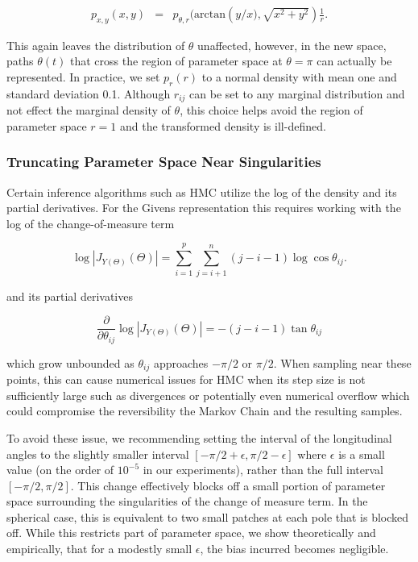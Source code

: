 \documentclass[ba]{imsart}
\numberwithin{equation}{section}
\theoremstyle{plain}
\begin{document}
\begin{eqnarray}
p_{x, y}(x,y) &=& p_{\theta, r}(\mathrm{arctan} \left(y/x), \sqrt{x^2 + y^2} \right) \frac{1}{r}.
\end{eqnarray}

\noindent This again leaves the distribution of $\theta$ unaffected, however, in the new space, paths $\theta(t)$ that cross the region of parameter space at $\theta = \pi$ can actually be represented. In practice, we set  $p_r(r)$ to a normal density with mean one and standard deviation 0.1. Although $r_{ij}$ can be set to any marginal distribution and not effect the marginal density of $\theta$, this choice helps avoid the region of parameter space $r = 1$ and the transformed density is ill-defined.

\subsubsection{Truncating Parameter Space Near Singularities}
\noindent  Certain inference algorithms such as HMC utilize the log of the density and its partial derivatives. For the Givens representation this requires working with the log of the change-of-measure term 

\begin{equation}
\log |J_{Y(\Theta)}(\Theta)| = \sum_{i=1}^p \sum_{j=i+1}^n (j-i-1) \log \cos \theta_{ij}.
\end{equation}

\noindent and its partial derivatives

\begin{equation}
\frac{\partial}{\partial \theta_{ij}}\log |J_{Y(\Theta)}(\Theta)| = -(j-i-1) \tan \theta_{ij}
\end{equation}

\noindent which grow unbounded as $\theta_{ij}$ approaches $-\pi/2$ or $\pi/2$. When sampling near these points, this can cause numerical issues for HMC when its step size is not sufficiently large such as divergences or potentially even numerical overflow which could compromise the reversibility the Markov Chain and the resulting samples. 

\noindent To avoid these issue, we recommending setting the interval of the longitudinal angles to the slightly smaller interval $[-\pi/2 + \epsilon, \pi/2 - \epsilon]$ where $\epsilon$ is a small value (on the order of $10^{-5}$ in our experiments), rather than the full interval $[-\pi/2, \pi/2]$. This change effectively blocks off a small portion of parameter space surrounding the singularities of the change of measure term. In the spherical case, this is equivalent to two small patches at each pole that is blocked off. While this restricts part of parameter space, we show theoretically and empirically, that for a modestly small $\epsilon$, the bias incurred becomes negligible. 
\end{document}
